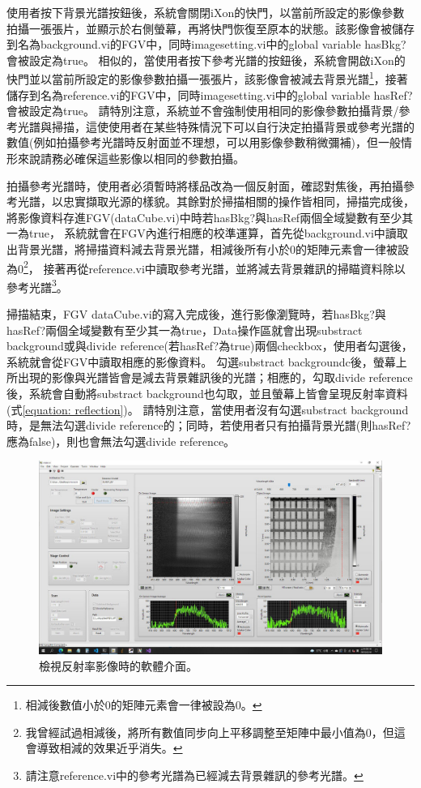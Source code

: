 \documentclass[12pt]{article}
\begin{document}
    使用者按下背景光譜按鈕後，系統會關閉iXon的快門，以當前所設定的影像參數拍攝一張張片，並顯示於右側螢幕，再將快門恢復至原本的狀態。該影像會被儲存到名為background.vi的FGV中，同時imagesetting.vi中的global variable hasBkg?會被設定為true。
    相似的，當使用者按下參考光譜的按鈕後，系統會開啟iXon的快門並以當前所設定的影像參數拍攝一張張片，該影像會被減去背景光譜\footnote{相減後數值小於0的矩陣元素會一律被設為0。}，接著儲存到名為reference.vi的FGV中，同時imagesetting.vi中的global variable hasRef?會被設定為true。
    請特別注意，系統並不會強制使用相同的影像參數拍攝背景/參考光譜與掃描，這使使用者在某些特殊情況下可以自行決定拍攝背景或參考光譜的數值(例如拍攝參考光譜時反射面並不理想，可以用影像參數稍微彌補)，但一般情形來說請務必確保這些影像以相同的參數拍攝。

    拍攝參考光譜時，使用者必須暫時將樣品改為一個反射面，確認對焦後，再拍攝參考光譜，以忠實擷取光源的樣貌。其餘對於掃描相關的操作皆相同，掃描完成後，將影像資料存進FGV(dataCube.vi)中時若hasBkg?與hasRef兩個全域變數有至少其一為true，
    系統就會在FGV內進行相應的校準運算，首先從background.vi中讀取出背景光譜，將掃描資料減去背景光譜，相減後所有小於0的矩陣元素會一律被設為0\footnote{我曾經試過相減後，將所有數值同步向上平移調整至矩陣中最小值為0，但這會導致相減的效果近乎消失。}，
    接著再從reference.vi中讀取參考光譜，並將減去背景雜訊的掃瞄資料除以參考光譜\footnote{請注意reference.vi中的參考光譜為已經減去背景雜訊的參考光譜。}。

    掃描結束，FGV dataCube.vi的寫入完成後，進行影像瀏覽時，若hasBkg?與hasRef?兩個全域變數有至少其一為true，Data操作區就會出現substract background或與divide reference(若hasRef?為true)兩個checkbox，使用者勾選後，系統就會從FGV中讀取相應的影像資料。
    勾選substract backgroundc後，螢幕上所出現的影像與光譜皆會是減去背景雜訊後的光譜；相應的，勾取divide reference後，系統會自動將substract background也勾取，並且螢幕上皆會呈現反射率資料(式\ref{equation: reflection})。
    請特別注意，當使用者沒有勾選substract background時，是無法勾選divide reference的；同時，若使用者只有拍攝背景光譜(則hasRef?應為false)，則也會無法勾選divide reference。
    \begin{figure}[ht]
        \centering
        \includegraphics[width=\linewidth]{reflection.jpeg}
        \caption{檢視反射率影像時的軟體介面。}
        \label{figure: reflection}
    \end{figure}
\end{document}
